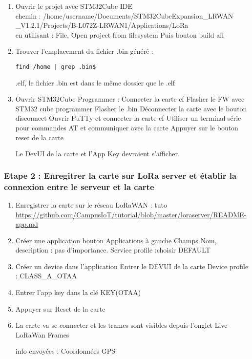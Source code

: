\documentclass{article}
\begin{document}
\begin{enumerate}
    


\item Ouvrir le projet avec STM32Cube IDE \\ chemin :  /home/username/Documents/STM32CubeExpansion\_LRWAN
\_V1.2.1/Projects/B-L072Z-LRWAN1/Applications/LoRa \\
en utilisant : File, Open project from filesystem
Puis bouton build all \\
\item Trouver l'emplacement du fichier .bin généré : 
\begin{verbatim}
find /home | grep .bin$
\end{verbatim}.elf, le fichier .bin est dans le même dossier que le .elf

\item Ouvrir STM32Cube Programmer :
Connecter la carte cf Flasher le FW avec STM32 cube programmer
Flasher le .bin
Déconnecter la carte avec le bouton disconnect
Ouvrir PuTTy et connecter la carte cf  Utiliser  un  terminal  série  pour  commandes
AT et communiquer avec la carte
Appuyer sur le bouton reset de la carte 

Le DevUI de la carte et l'App Key devraient s'afficher.

\end{enumerate}


\subsubsection{Etape 2 : Enregitrer la carte sur LoRa server et établir la connexion entre le serveur et la carte}

\begin{enumerate}
    

 \item Enregistrer la carte sur le réseau LoRaWAN :
tuto 
\url{https://github.com/CampusIoT/tutorial/blob/master/loraserver/README-app.md}

\item Créer une application bouton Applications à gauche
Champs Nom, description : pas d'importance.
Service profile :choisir DEFAULT

\item Créer un device dans l'application
Entrer le DEVUI de la carte
Device profile : CLASS\_A\_OTAA

\item Entrer l'app key dans la clé KEY(OTAA)

\item Appuyer sur Reset de la carte

\item La carte va se connecter et les trames sont visibles depuis l'onglet Live LoRaWan Frames

info envoyées : Coordonnées GPS
\end{enumerate}
\end{document}
